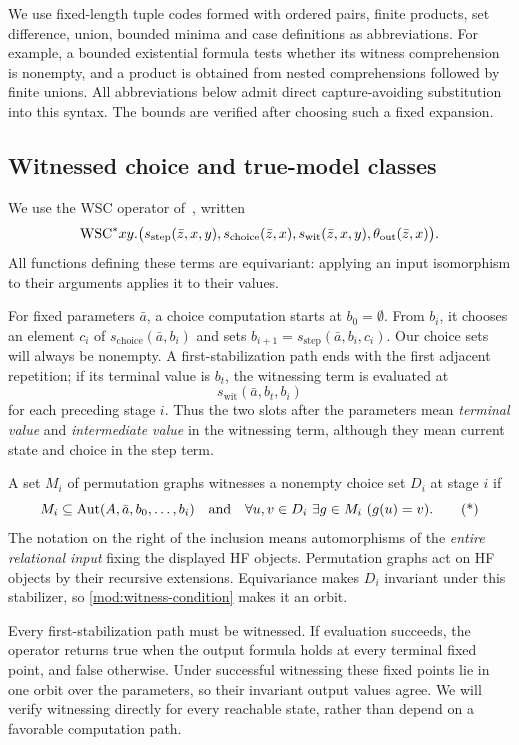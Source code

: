 We use fixed-length tuple codes formed with ordered pairs, finite products,
set difference, union, bounded minima and case definitions as abbreviations.
For example, a bounded existential formula tests whether its witness
comprehension is nonempty, and a product is obtained from nested
comprehensions followed by finite unions. All abbreviations below admit
direct capture-avoiding substitution into this syntax. The bounds are
verified after choosing such a fixed expansion.

\subsection{Witnessed choice and true-model classes}

We use the WSC operator of~\cite[Sections~3.1--3.2]{ls2023},
written
\[
 \mathrm{WSC}^{*}xy.
 \bigl(s_{\mathrm{step}}(\bar z,x,y),
       s_{\mathrm{choice}}(\bar z,x),
       s_{\mathrm{wit}}(\bar z,x,y),
       \theta_{\mathrm{out}}(\bar z,x)\bigr).
\]
All functions defining these terms are equivariant: applying an input
isomorphism to their arguments applies it to their values.

For fixed parameters \(\bar a\), a choice computation starts at
\(b_0=\emptyset\). From \(b_i\), it chooses an element \(c_i\) of
\(s_{\mathrm{choice}}(\bar a,b_i)\) and sets
\(b_{i+1}=s_{\mathrm{step}}(\bar a,b_i,c_i)\).
Our choice sets will always be nonempty. A first-stabilization path ends
with the first adjacent repetition; if its terminal value is \(b_t\),
the witnessing term is evaluated at
\[
             s_{\mathrm{wit}}(\bar a,b_t,b_i)
\]
for each preceding stage \(i\). Thus the two slots after the parameters
mean \emph{terminal value} and \emph{intermediate value} in the witnessing
term, although they mean current state and choice in the step term.

A set \(M_i\) of permutation graphs witnesses a nonempty choice set \(D_i\)
at stage \(i\) if
\[
 M_i\subseteq\operatorname{Aut}(A,\bar a,b_0,\ldots,b_i)
 \quad\text{and}\quad
 \forall u,v\in D_i\ \exists g\in M_i\ (g(u)=v).
 \tag{*}\label{mod:witness-condition}
\]
The notation on the right of the inclusion means automorphisms of the
\emph{entire relational input} fixing the displayed HF objects.
Permutation graphs act on HF objects by their recursive extensions.
Equivariance makes \(D_i\) invariant under this stabilizer, so
\eqref{mod:witness-condition} makes it an orbit.

Every first-stabilization path must be witnessed. If evaluation succeeds,
the operator returns true when the output formula holds at every terminal
fixed point, and false otherwise. Under successful witnessing these
fixed points lie in one orbit over the parameters, so
their invariant output values agree. We will verify witnessing directly
for every reachable state, rather than depend on a favorable computation
path.

